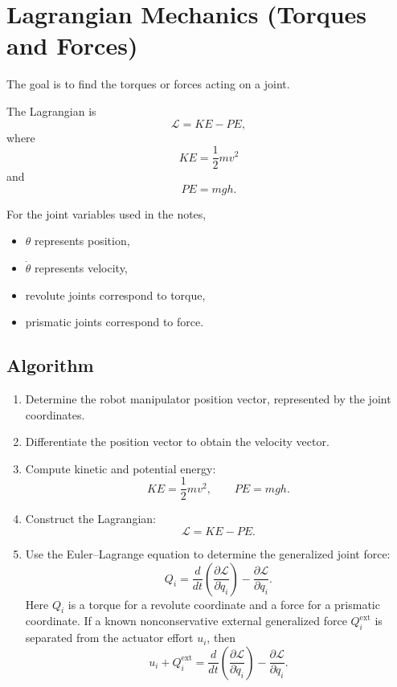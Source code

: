 \documentclass[11pt]{article}
\begin{document}
\section{Lagrangian Mechanics (Torques and Forces)}

The goal is to find the torques or forces acting on a joint.

The Lagrangian is
\[
\mathcal{L} = KE - PE,
\]
where
\[
KE = \frac{1}{2}mv^2
\]
and
\[
PE = mgh.
\]

For the joint variables used in the notes,
\begin{itemize}
    \item $\theta$ represents position,
    \item $\dot{\theta}$ represents velocity,
    \item revolute joints correspond to torque,
    \item prismatic joints correspond to force.
\end{itemize}

\subsection{Algorithm}

\begin{enumerate}
    \item Determine the robot manipulator position vector, represented by the joint coordinates.
    \item Differentiate the position vector to obtain the velocity vector.
    \item Compute kinetic and potential energy:
    \[
    KE = \frac{1}{2}mv^2,
    \qquad
    PE = mgh.
    \]
    \item Construct the Lagrangian:
    \[
    \mathcal{L}=KE-PE.
    \]
    \item Use the Euler--Lagrange equation to determine the generalized joint force:
    \[
    \boxed{
    Q_i
    =
    \frac{d}{dt}
    \left(
    \frac{\partial\mathcal{L}}{\partial\dot q_i}
    \right)
    -
    \frac{\partial\mathcal{L}}{\partial q_i}
    }.
    \]
    Here $Q_i$ is a torque for a revolute coordinate and a force for a prismatic coordinate. If a known nonconservative external generalized force $Q_i^{\mathrm{ext}}$ is separated from the actuator effort $u_i$, then
    \[
    u_i+Q_i^{\mathrm{ext}}
    =
    \frac{d}{dt}
    \left(
    \frac{\partial\mathcal{L}}{\partial\dot q_i}
    \right)
    -
    \frac{\partial\mathcal{L}}{\partial q_i}.
    \]
\end{enumerate}
\end{document}
